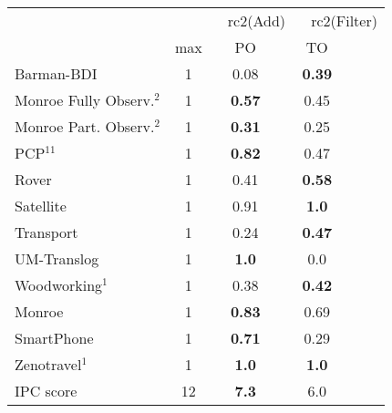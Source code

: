 \begin{tabular}{lccccl} 
\toprule 
  && \multicolumn{2}{c}{rc2(Add)} & \multicolumn{2}{c}{rc2(Filter)} \\ 
\cmidrule(lr){3-4} \cmidrule(lr){5-6}  
 & max &PO &\multicolumn{2}{c}{ TO  } \\ 
\midrule 
Barman-BDI & 1 & 0.08 &\multicolumn{2}{c}{ \textbf{0.39}  } \\ 
Monroe Fully Observ.$^{2}$ & 1 & \textbf{0.57} &\multicolumn{2}{c}{ 0.45  } \\ 
Monroe Part. Observ.$^{2}$ & 1 & \textbf{0.31} &\multicolumn{2}{c}{ 0.25  } \\ 
PCP$^{11}$ & 1 & \textbf{0.82} &\multicolumn{2}{c}{ 0.47  } \\ 
Rover & 1 & 0.41 &\multicolumn{2}{c}{ \textbf{0.58}  } \\ 
Satellite & 1 & 0.91 &\multicolumn{2}{c}{ \textbf{1.0}  } \\ 
Transport & 1 & 0.24 &\multicolumn{2}{c}{ \textbf{0.47}  } \\ 
UM-Translog & 1 & \textbf{1.0} &\multicolumn{2}{c}{ 0.0  } \\ 
Woodworking$^{1}$ & 1 & 0.38 &\multicolumn{2}{c}{ \textbf{0.42}  } \\ 
\midrule 
 Monroe & 1 & \textbf{0.83} &\multicolumn{2}{c}{ 0.69  } \\ 
SmartPhone & 1 & \textbf{0.71} &\multicolumn{2}{c}{ 0.29  } \\ 
Zenotravel$^{1}$ & 1 & \textbf{1.0} &\multicolumn{2}{c}{ \textbf{1.0}  } \\ 
\midrule 
 IPC score & 12 & \textbf{7.3} &\multicolumn{2}{c}{ 6.0  } \\ 
\bottomrule 
 \end{tabular} 
